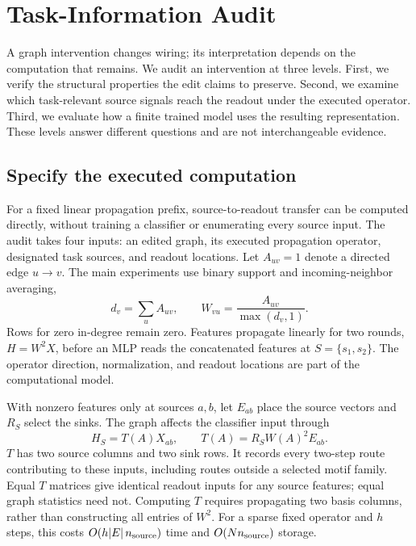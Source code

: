 \section{Task-Information Audit}
\label{sec:method}

A graph intervention changes wiring; its interpretation depends on the
computation that remains. We audit an intervention at three levels. First, we
verify the structural properties the edit claims to preserve. Second, we
examine which task-relevant source signals reach the readout under the
executed operator. Third, we evaluate how a finite trained model uses the
resulting representation. These levels answer different questions and are not
interchangeable evidence.

\subsection{Specify the executed computation}
\label{sec:operator}

For a fixed linear propagation prefix, source-to-readout transfer can be
computed directly, without training a classifier or enumerating every source
input. The audit takes four inputs: an edited graph, its executed propagation
operator, designated task sources, and readout locations.
Let $A_{uv}=1$ denote a directed edge $u\!\to\!v$. The main experiments
use binary support and incoming-neighbor averaging,
\begin{equation}
 d_v=\sum_u A_{uv},\qquad
 W_{vu}=\frac{A_{uv}}{\max(d_v,1)}.
 \label{eq:operator}
\end{equation}
Rows for zero in-degree remain zero. Features propagate linearly for two
rounds, $H=W^2X$, before an MLP reads the concatenated features at
$S=\{s_1,s_2\}$. The operator direction, normalization, and readout
locations are part of the computational model.

With nonzero features only at sources $a,b$, let $E_{ab}$ place the source
vectors and $R_S$ select the sinks. The graph affects the classifier input
through
\begin{equation}
 H_S=T(A)X_{ab},\qquad T(A)=R_SW(A)^2E_{ab}.
 \label{eq:transfer}
\end{equation}
$T$ has two source columns and two sink rows. It records every two-step
route contributing to these inputs, including routes outside a selected
motif family. Equal $T$ matrices give identical readout inputs for any
source features; equal graph statistics need not. Computing $T$ requires
propagating two basis columns, rather than constructing all entries of
$W^2$. For a sparse fixed operator and $h$ steps, this costs
$O(h|E|\,n_{\rm source})$ time and $O(Nn_{\rm source})$ storage.

